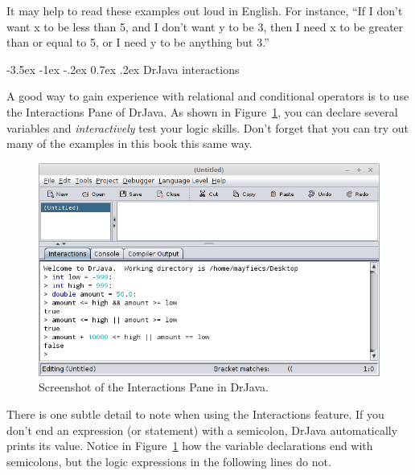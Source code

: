 \documentclass[12pt]{book}
\makeatletter
\theoremstyle{exercise}
\renewcommand{\section}{\@startsection{section}{1}{\z@}%
    {-3.5ex \@plus -1ex \@minus -.2ex}%
    {0.7ex \@plus.2ex}%
    {\normalfont\Large\bfseries}}
\makeatother
\begin{document}
It may help to read these examples out loud in English.
For instance, ``If I don't want x to be less than 5, and I don't want y to be 3, then I need x to be greater than or equal to 5, or I need y to be anything but 3.''


\section{DrJava interactions}

A good way to gain experience with relational and conditional operators is to use the Interactions Pane of DrJava.
As shown in Figure~\ref{fig:drjava}, you can declare several variables and {\it interactively} test your logic skills.
Don't forget that you can try out many of the examples in this book this same way.

%

\begin{figure}[!h]
\begin{center}
\includegraphics[width=\textwidth]{figs/drjava-logic.png}
\caption{Screenshot of the Interactions Pane in DrJava.}
\label{fig:drjava}
\end{center}
\end{figure}

There is one subtle detail to note when using the Interactions feature.
If you don't end an expression (or statement) with a semicolon, DrJava automatically prints its value.
Notice in Figure~\ref{fig:drjava} how the variable declarations end with semicolons, but the logic expressions in the following lines do not.
\end{document}

